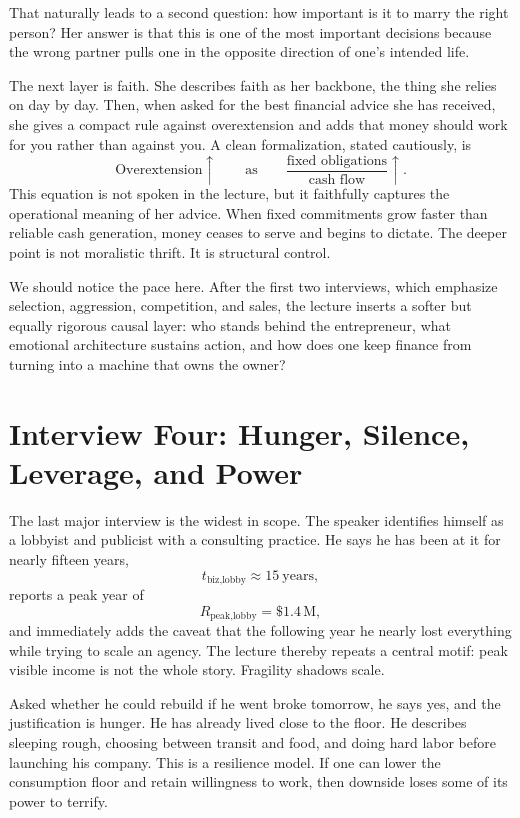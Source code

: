 That naturally leads to a second question: how important is it to marry the right person? Her answer is that this is one of the most important decisions because the wrong partner pulls one in the opposite direction of one's intended life.

The next layer is faith. She describes faith as her backbone, the thing she relies on day by day. Then, when asked for the best financial advice she has received, she gives a compact rule against overextension and adds that money should work for you rather than against you. A clean formalization, stated cautiously, is
\begin{equation}
\text{Overextension}\uparrow
\qquad \text{as} \qquad
\frac{\text{fixed obligations}}{\text{cash flow}} \uparrow.
\end{equation}
This equation is not spoken in the lecture, but it faithfully captures the operational meaning of her advice. When fixed commitments grow faster than reliable cash generation, money ceases to serve and begins to dictate. The deeper point is not moralistic thrift. It is structural control.

We should notice the pace here. After the first two interviews, which emphasize selection, aggression, competition, and sales, the lecture inserts a softer but equally rigorous causal layer: who stands behind the entrepreneur, what emotional architecture sustains action, and how does one keep finance from turning into a machine that owns the owner?

\section{Interview Four: Hunger, Silence, Leverage, and Power}

The last major interview is the widest in scope. The speaker identifies himself as a lobbyist and publicist with a consulting practice. He says he has been at it for nearly fifteen years,
\[
t_{\text{biz,lobby}} \approx 15\ \text{years},
\]
reports a peak year of
\[
R_{\text{peak,lobby}}=\text{\$}1.4\,\mathrm{M},
\]
and immediately adds the caveat that the following year he nearly lost everything while trying to scale an agency. The lecture thereby repeats a central motif: peak visible income is not the whole story. Fragility shadows scale.

Asked whether he could rebuild if he went broke tomorrow, he says yes, and the justification is hunger. He has already lived close to the floor. He describes sleeping rough, choosing between transit and food, and doing hard labor before launching his company. This is a resilience model. If one can lower the consumption floor and retain willingness to work, then downside loses some of its power to terrify.

